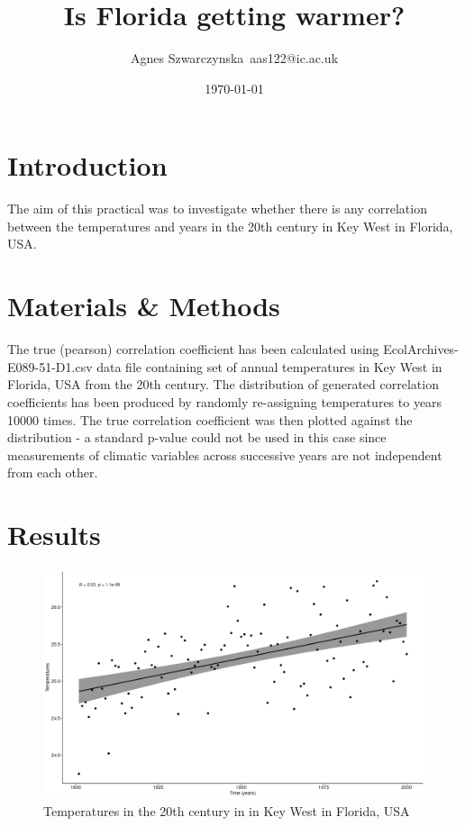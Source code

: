 \documentclass{article}
\title{Is Florida getting warmer?}
\author{Agnes Szwarczynska\, aas122@ic.ac.uk}
\date{\today}
\begin{document}
    \maketitle

    \section{Introduction}

   The aim of this practical was to investigate whether there is any correlation between the temperatures and years in the 20th century in Key West in Florida, USA.

    \section{Materials \& Methods}
    
    The true (pearson) correlation coefficient has been calculated using EcolArchives-E089-51-D1.csv data file containing set of annual temperatures in Key West in Florida, USA from the 20th century. The distribution of generated correlation coefficients has been produced by randomly re-assigning temperatures to years 10000 times. The true correlation coefficient was then plotted against the distribution - a standard p-value could not be used in this case since measurements of climatic variables across successive years are not independent from each other.
    

    \section{Results}
    
\begin{figure}[H]
\centering
\includegraphics[scale=0.2]{../data/plot1.png}
\caption{Temperatures in the 20th century in in Key West in Florida, USA }
\end{figure}
\end{document}
